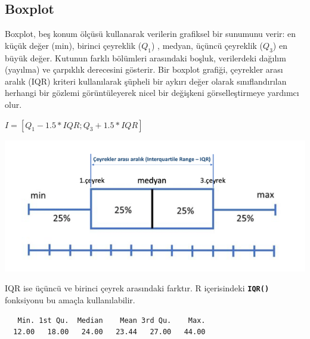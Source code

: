 \documentclass[
  letterpaper,
  DIV=11,
  numbers=noendperiod]{scrreprt}
\newenvironment{Shaded}{\begin{snugshade}}{\end{snugshade}}
\newcommand{\CommentTok}[1]{\textcolor[rgb]{0.37,0.37,0.37}{#1}}
\newcommand{\FunctionTok}[1]{\textcolor[rgb]{0.28,0.35,0.67}{#1}}
\newcommand{\NormalTok}[1]{\textcolor[rgb]{0.00,0.23,0.31}{#1}}
\newcommand{\SpecialCharTok}[1]{\textcolor[rgb]{0.37,0.37,0.37}{#1}}
\begin{document}
\subsection*{Boxplot}\label{boxplot}

Boxplot, beş konum ölçüsü kullanarak verilerin grafiksel bir sunumunu
verir: en küçük değer (min), birinci çeyreklik (\(Q_1\)) , medyan,
üçüncü çeyreklik (\(Q_3\)) en büyük değer. Kutunun farklı bölümleri
arasındaki boşluk, verilerdeki dağılım (yayılma) ve çarpıklık derecesini
gösterir. Bir boxplot grafiği, çeyrekler arası aralık (IQR) kriteri
kullanılarak şüpheli bir aykırı değer olarak sınıflandırılan herhangi
bir gözlemi görüntüleyerek nicel bir değişkeni görselleştirmeye yardımcı
olur.

\(I = [Q_1-1.5 * IQR ; Q_3 + 1.5 * IQR]\)

\begin{center}
\includegraphics{images/boxplot.png}
\end{center}

IQR ise üçüncü ve birinci çeyrek arasındaki farktır. R içerisindeki
\textbf{\texttt{IQR()}} fonksiyonu bu amaçla kullanılabilir.

\begin{Shaded}
\end{Shaded}

\begin{verbatim}
   Min. 1st Qu.  Median    Mean 3rd Qu.    Max. 
  12.00   18.00   24.00   23.44   27.00   44.00 
\end{verbatim}

\begin{Shaded}
\end{Shaded}
\end{document}
